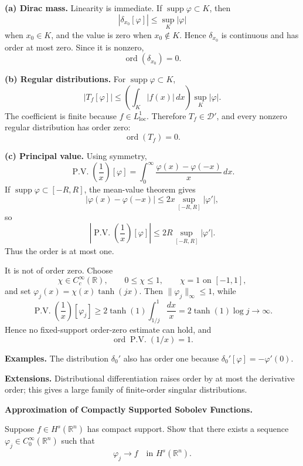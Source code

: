 \begin{solution}

\par\smallskip\noindent\textbf{(a) Dirac mass.}
Linearity is immediate. If \(\operatorname{supp}\varphi\subset K\), then
\[
|\delta_{x_0}[\varphi]|\le \sup_K|\varphi|
\]
when \(x_0\in K\), and the value is zero when \(x_0\notin K\). Hence
\(\delta_{x_0}\) is continuous and has order at most zero. Since it is
nonzero,
\[
\boxed{\operatorname{ord}(\delta_{x_0})=0.}
\]

\par\smallskip\noindent\textbf{(b) Regular distributions.}
For \(\operatorname{supp}\varphi\subset K\),
\[
|T_f[\varphi]|
\le
\left(\int_K|f(x)|\,dx\right)\sup_K|\varphi|.
\]
The coefficient is finite because \(f\in L^1_{\mathrm{loc}}\). Therefore
\(T_f\in\mathcal D'\), and every nonzero regular distribution has order zero:
\[
\boxed{\operatorname{ord}(T_f)=0.}
\]

\par\smallskip\noindent\textbf{(c) Principal value.}
Using symmetry,
\[
\operatorname{P.V.}\!\left(\frac1x\right)[\varphi]
=
\int_0^\infty\frac{\varphi(x)-\varphi(-x)}x\,dx.
\]
If \(\operatorname{supp}\varphi\subset[-R,R]\), the mean-value theorem gives
\[
|\varphi(x)-\varphi(-x)|\le2x\sup_{[-R,R]}|\varphi'|,
\]
so
\[
\left|\operatorname{P.V.}\!\left(\frac1x\right)[\varphi]\right|
\le2R\sup_{[-R,R]}|\varphi'|.
\]
Thus the order is at most one.

It is not of order zero. Choose
\[
\chi\in C_c^\infty(\mathbb R),\qquad
0\le\chi\le1,\qquad \chi=1\text{ on }[-1,1],
\]
and set \(\varphi_j(x)=\chi(x)\tanh(jx)\). Then
\(\|\varphi_j\|_\infty\le1\), while
\[
\operatorname{P.V.}\!\left(\frac1x\right)[\varphi_j]
\ge
2\tanh(1)\int_{1/j}^1\frac{dx}{x}
=
2\tanh(1)\log j\to\infty.
\]
Hence no fixed-support order-zero estimate can hold, and
\[
\boxed{\operatorname{ord}\operatorname{P.V.}(1/x)=1.}
\]

\medskip
\noindent\textbf{Examples.}
The distribution \(\delta_0'\) also has order one because
\(\delta_0'[\varphi]=-\varphi'(0)\).

\medskip
\noindent\textbf{Extensions.}
Distributional differentiation raises order by at most the derivative order;
this gives a large family of finite-order singular distributions.
\end{solution}

\begin{problem}[CP-II-0090]
\label{prob:cp-ii-0090}
\textbf{Approximation of Compactly Supported Sobolev Functions.}

\hspace*{1.5em}Suppose $f \in H^{s}(\mathbb{R}^n)$ has compact support.
	Show that there exists a sequence $\varphi_j \in C_0^\infty(\mathbb{R}^n)$ such that
	\[
	\varphi_j \longrightarrow f \quad\text{in } H^{s}(\mathbb{R}^n).
	\]
\end{problem}

